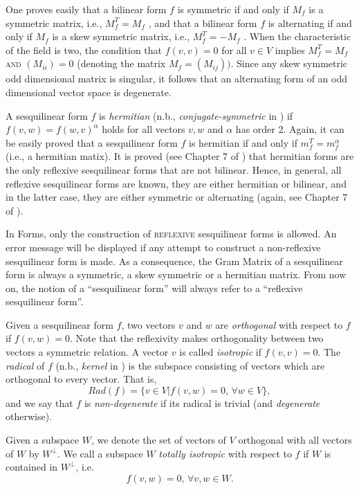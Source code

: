 \documentclass[a4paper,11pt]{report}
\begin{document}
{{ One proves easily that a bilinear form $f$ is symmetric if and only if $M_f$ is a symmetric matrix, i.e., $M_f^T=M_f$ , and that a bilinear form $f$ is alternating if and only if $M_f$ is a skew symmetric matrix, i.e., $M_f^T=-M_f$ . When the characteristic of the field is two, the condition that $f(v,v)=0$ for all $v \in V$ implies $M_f^T=M_f$  \textsc{and} $(M_{ii})=0$ (denoting the matrix $M_f = (M_{ij}))$. Since any skew symmetric odd dimensional matrix is singular, it follows that
an alternating form of an odd dimensional vector space is degenerate. 

 A sesquilinear form $f$ is \emph{hermitian} (n.b., \emph{conjugate-symmetric} in \cite{Atlas}) if $f(v,w)=f(w,v)^\alpha$  holds for all vectors $v,w$  and $\alpha$ has order 2. Again, it can be easily proved that a sesquilinear form $f$ is hermitian if and only if $m_f^T = m_f^{\alpha}$  (i.e., a hermitian matix). It is proved (see Chapter 7 of \cite{Taylor}) that hermitian forms are the only reflexive sesquilinear forms that are not
bilinear. Hence, in general, all reflexive sesquilinear forms are known, they
are either hermitian or bilinear, and in the latter case, they are either
symmetric or alternating (again, see Chapter 7 of \cite{Taylor}). 

 In \textsf{Forms}, only the construction of \textsc{reflexive} sesquilinear forms is allowed. An error message will be displayed if any
attempt to construct a non-reflexive sesquilinear form is made. As a
consequence, the Gram Matrix of a sesquilinear form is always a symmetric, a
skew symmetric or a hermitian matrix. From now on, the notion of a
``sesquilinear form'' will always refer to a ``reflexive sesquilinear form''. 

 Given a sesquilinear form $f$, two vectors $v$ and $w$ are \emph{orthogonal} with respect to $f$ if $f(v,w) = 0$. Note that the reflexivity makes orthogonality between two vectors a
symmetric relation. A vector $v$ is called \emph{isotropic} if $f(v,v)=0$. The \emph{radical} of $f$ (n.b., \emph{kernel} in \cite{Atlas}) is the subspace consisting of vectors which are orthogonal to every vector.
That is, 
\[Rad(f) = \{v \in V | f(v,w) = 0,\, \forall w \in V\},\]
 and we say that $f$ is \emph{non-degenerate} if its radical is trivial (and \emph{degenerate} otherwise). 

Given a subspace $W$, we denote the set of vectors of $V$ orthogonal with all vectors of $W$ by $W^\perp$. We call a subspace $W$ \emph{totally isotropic} with respect to $f$ if $W$ is contained in $W^\perp$, i.e. 
\[f(v,w) = 0,\, \forall v,w \in W.\]
 

}}
\end{document}
